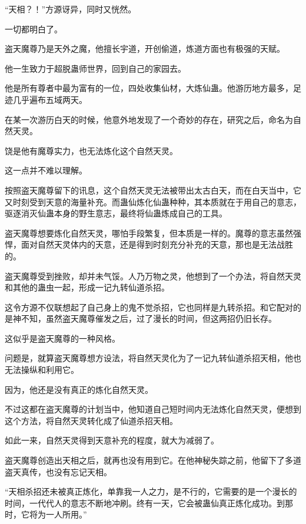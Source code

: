
\begin{this_body}

“天相？！”方源讶异，同时又恍然。

一切都明白了。

盗天魔尊乃是天外之魔，他擅长宇道，开创偷道，炼道方面也有极强的天赋。

他一生致力于超脱蛊师世界，回到自己的家园去。

他是所有尊者中最为富有的一位，四处收集仙材，大炼仙蛊。他游历地方最多，足迹几乎遍布五域两天。

在某一次游历白天的时候，他意外地发现了一个奇妙的存在，研究之后，命名为自然天灵。

饶是他有魔尊实力，也无法炼化这个自然天灵。

这一点并不难以理解。

按照盗天魔尊留下的讯息，这个自然天灵无法被带出太古白天，而在白天当中，它又时刻受到天意的海量补充。而蛊仙炼化仙蛊种种，其本质就在于用自己的意志，驱逐消灭仙蛊本身的野生意志，最终将仙蛊炼成自己的工具。

盗天魔尊想要炼化自然天灵，哪怕手段繁复，但本质是一样的。魔尊的意志虽然强悍，面对自然天灵体内的天意，还是得到时刻充分补充的天意，那也是无法战胜的。

盗天魔尊受到挫败，却并未气馁。人乃万物之灵，他想到了一个办法，将自然天灵和其他的蛊虫一起，形成一记九转仙道杀招。

这令方源不仅联想起了自己身上的鬼不觉杀招，它也同样是九转杀招。和它配对的是神不知，虽然盗天魔尊催发之后，过了漫长的时间，但这两招仍旧长存。

这似乎是盗天魔尊的一种风格。

问题是，就算盗天魔尊想方设法，将自然天灵化为了一记九转仙道杀招天相，他也无法操纵和利用它。

因为，他还是没有真正的炼化自然天灵。

不过这都在盗天魔尊的计划当中，他知道自己短时间内无法炼化自然天灵，便想到这个方法，将自然天灵转化成了仙道杀招天相。

如此一来，自然天灵得到天意补充的程度，就大为减弱了。

盗天魔尊创造出天相之后，就再也没有用到它。在他神秘失踪之前，他留下了多道盗天真传，也没有忘记天相。

“天相杀招还未被真正炼化，单靠我一人之力，是不行的，它需要的是一个漫长的时间，一代代人的意志不断地冲刷。终有一天，它会被蛊仙真正炼化成功。到那时，它将为一人所用。”


\end{this_body}
